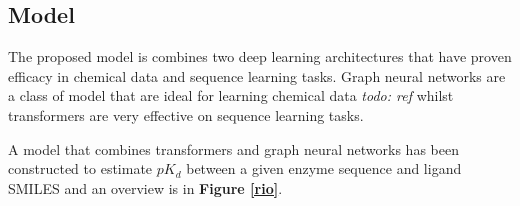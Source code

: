 \documentclass{article}
\begin{document}
\pagebreak

\subsection{Model} %
The proposed model is combines two deep learning architectures that have proven efficacy in chemical data and sequence learning tasks. Graph neural networks are a class of model that are ideal for learning chemical data \textit{todo: ref} whilst transformers are very effective on sequence learning tasks. %
\par
A model that combines transformers and graph neural networks has been constructed to estimate $pK_d$ between a given enzyme sequence and ligand SMILES and an overview is in \textbf{Figure \ref{rio}}. %
\end{document}

